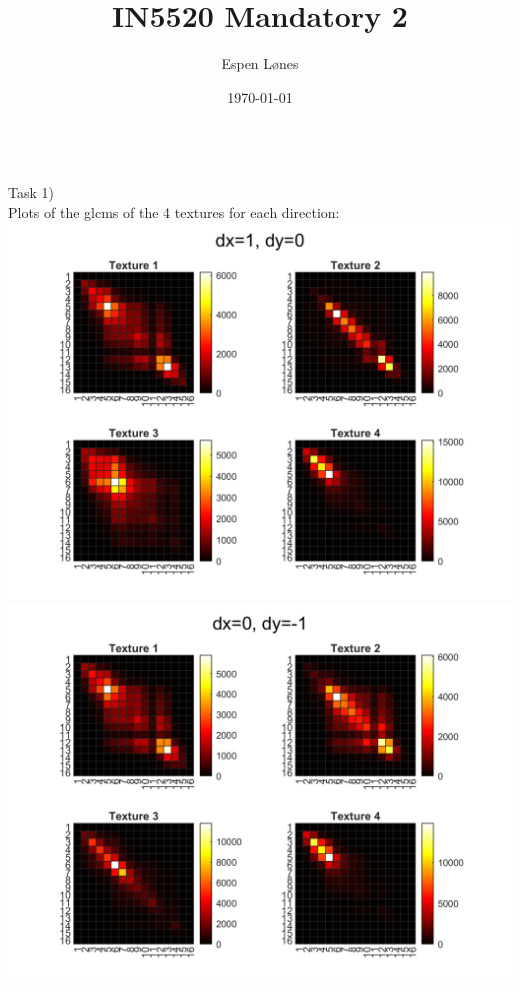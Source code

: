 \documentclass[12pt, letterpaper, twoside]{article}
\begin{document}
\title{IN5520 Mandatory 2}
\author{Espen Lønes}
\date{\today}
\maketitle
\ \\
Task 1)\\
Plots of the glcms of the 4 textures for each direction:\\
\includegraphics[scale=0.4]{"task1_d1"}\\
\includegraphics[scale=0.4]{"task1_d2"}\\
\end{document}
